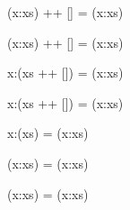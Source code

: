 \documentclass{beamer}
\newcommand{\ca}[1]{{\color{blue}#1}}
\newcommand{\cb}[1]{{\color{violet}#1}}
\newcommand{\cc}[1]{{\color{red}#1}}
\begin{document}
\begin{frame}[t,fragile]
\begin{center}
\begin{overprint}
\begin{semiverbatim}
(x:xs) ++ [] = (x:xs)
\end{semiverbatim}

\begin{semiverbatim}
(\ca{x}:\cb{xs}) ++ \cc{[]} = (x:xs)
\end{semiverbatim}

\begin{semiverbatim}
\ca{x}:(\cb{xs} ++ \cc{[]}) = (x:xs)
\end{semiverbatim}

\begin{semiverbatim}
x:(\alert{xs ++ []}) = (x:xs)
\end{semiverbatim}

\begin{semiverbatim}
x:(\alert{xs})       = (x:xs)
\end{semiverbatim}

\begin{semiverbatim}
\alert{(x:xs)}       = \alert{(x:xs)}
\end{semiverbatim}

\begin{semiverbatim}
(x:xs)       = (x:xs)
\end{semiverbatim}

\end{overprint}
\end{center}

\end{frame}
\end{document}
